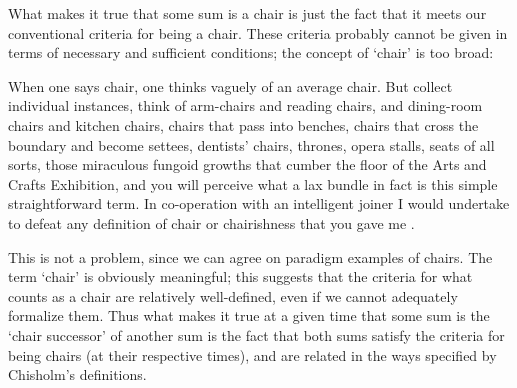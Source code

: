 \documentclass[11pt]{article}
\newenvironment{squote}{%
\begin{spacing}{1}
\begin{list}{}{%
\setlength{\labelwidth}{0pt}%
\rightmargin\leftmargin%
}
\item\relax
}{%
\end{list}%
\end{spacing}
}
\begin{document}
\begin{spacing}{1.5}
What makes it true that some sum is a chair is just the fact that it
meets our conventional criteria for being a chair.  These criteria
probably cannot be given in terms of necessary and sufficient
conditions; the concept of `chair' is too broad:

\begin{squote}
When one says chair, one thinks vaguely of an average chair.  But
collect individual instances, think of arm-chairs and reading chairs,
and dining-room chairs and kitchen chairs, chairs that pass into
benches, chairs that cross the boundary and become settees, dentists'
chairs, thrones, opera stalls, seats of all sorts, those miraculous
fungoid growths that cumber the floor of the Arts and Crafts
Exhibition, and you will perceive what a lax bundle in fact is this
simple straightforward term.  In co-operation with an intelligent
joiner I would undertake to defeat any definition of chair or
chairishness that you gave me \citep[384--385]{wells1904}.
\end{squote}
This is not a problem, since we can agree on paradigm examples of
chairs.  The term `chair' is obviously meaningful; this suggests that
the criteria for what counts as a chair are relatively well-defined,
even if we cannot adequately formalize them.  Thus what makes it true
at a given time that some sum is the `chair successor' of another sum
is the fact that both sums satisfy the criteria for being chairs (at
their respective times), and are related in the ways specified by
Chisholm's definitions.





\end{spacing}
\end{document}

